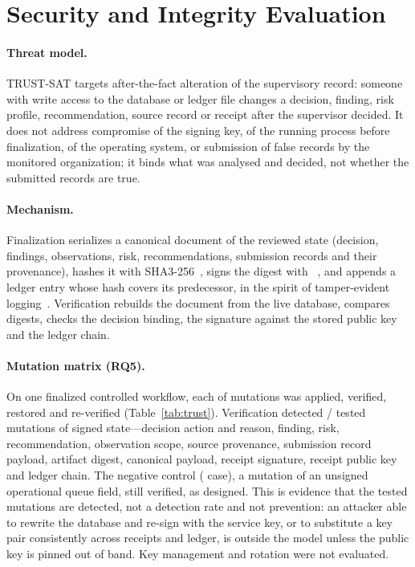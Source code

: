 \section{Security and Integrity Evaluation}
\label{sec:integrity}

\paragraph{Threat model.}
TRUST-SAT targets after-the-fact alteration of the supervisory record: someone
with write access to the database or ledger file changes a decision, finding,
risk profile, recommendation, source record or receipt after the supervisor
decided. It does not address compromise of the signing key, of the running
process before finalization, of the operating system, or submission of false
records by the monitored organization; it binds what was analysed and decided,
not whether the submitted records are true.

\paragraph{Mechanism.}
Finalization serializes a canonical document of the reviewed state (decision,
findings, observations, risk, recommendations, submission records and their
provenance), hashes it with SHA3-256~\cite{nist2015fips202}, signs the digest with
~\cite{nist2024fips204}, and appends a ledger entry whose hash
covers its predecessor, in the spirit of tamper-evident logging~\cite{schneier1999logs,crosby2009logging}.
Verification rebuilds the document from the live database, compares digests,
checks the decision binding, the signature against the stored public key and the
ledger chain.

\paragraph{Mutation matrix (RQ5).}
On one finalized controlled workflow, each of  mutations was applied,
verified, restored and re-verified (Table~\ref{tab:trust}). Verification detected
/ tested mutations of signed state---decision action
and reason, finding, risk, recommendation, observation scope, source provenance,
submission record payload, artifact digest, canonical payload, receipt signature,
receipt public key and ledger chain. The negative control ( case), a
mutation of an unsigned operational queue field, still verified, as designed. This is evidence
that the tested mutations are detected, not a detection rate and not prevention: an
attacker able to rewrite the database and re-sign with the service key, or to
substitute a key pair consistently across receipts and ledger, is outside the model
unless the public key is pinned out of band. Key management and
rotation were not evaluated.

